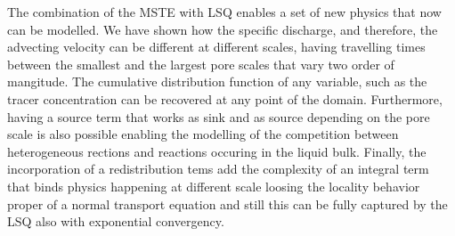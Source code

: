 \documentclass{CFD2011}
\begin{document}
The combination of the MSTE with LSQ enables a set of new physics that now can be modelled. We have shown how the specific discharge, and therefore, the advecting velocity can be different at different scales, having travelling times between the smallest and the largest pore scales that vary two order of mangitude. The cumulative distribution function of any variable, such as the tracer concentration can be recovered at any point of the domain. Furthermore, having a source term that works as sink and as source depending on the pore scale is also possible enabling the modelling of the competition between heterogeneous rections and reactions occuring in the liquid bulk. Finally, the incorporation of a redistribution tems add the complexity of an integral term that binds physics happening at different scale loosing the locality behavior proper of a normal transport equation and still this can be fully captured by the LSQ also with exponential convergency.
\end{document}
